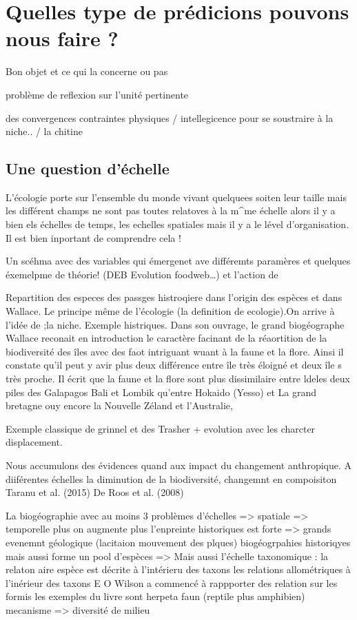 \section{Quelles type de prédicions pouvons nous faire
?}\label{quelles-type-de-pruxe9dicions-pouvons-nous-faire}

Bon objet et ce qui la concerne ou pas

problème de reflexion sur l'unité pertinente

des convergences contraintes physiques / intellegicence pour se
soustraire à la niche.. / la chitine

\subsection{Une question d'échelle}\label{une-question-duxe9chelle}

L'écologie porte sur l'ensemble du monde vivant quelquees soiten leur
taille mais les différent champs ne sont pas toutes relatoves à la
m\^{}me échelle alors il y a bien els échelles de temps, les echelles
spatiales mais il y a le lével d'organisation. Il est bien inportant de
comprendre cela !

Un scéhma avec des variables qui émergenet ave différemts paramères et
quelques éxemelpme de théorie! (DEB Evolution foodweb\ldots{}) et
l'action de

Repartition des especes des passges histroqiere dans l'origin des
espèces et dans Wallace. Le principe même de l'écologie (la definition
de ecologie).On arrive à l'idée de ;la niche. Exemple histriques. Dans
son ouvrage, le grand biogéographe Wallace reconait en introduction le
caractère facinant de la réaortition de la biodiversité des îles avec
des faot intriguant wuant à la faune et la flore. Ainsi il constate
qu'il peut y avir plus deux différence entre île très éloigné et deux
île s très proche. Il écrit que la faune et la flore sont plus
dissimilaire entre ldeles deux piles des Galapagos Bali et Lombik
qu'entre Hokaido (Yesso) et La grand bretagne ouy encore la Nouvelle
Zéland et l'Australie,

Exemple classique de grinnel et des Trasher + evolution avec les
charcter displacement.

Nous accumulons des évidences quand aux impact du changement
anthropique. A diiférentes échelles la diminution de la biodiversité,
changemnt en compoisiton Taranu et al. (2015) De Roos et al. (2008)

La biogéographie avec au moins 3 problèmes d'échelles =\textgreater{}
spatiale =\textgreater{} temporelle plus on augmente plus l'enpreinte
historiques est forte =\textgreater{} grands evenemnt géologique
(lacitaion mouvement des plques) biogéogrpahies historiqyes mais aussi
forme un pool d'espèces =\textgreater{} Mais aussi l'échelle taxonomique
: la relaton aire espèce est décrite à l'intérieru des taxons les
relations allométriques à l'inérieur des taxons E O Wilson a commencé à
rappporter des relation sur les formis les exemples du livre sont
herpeta faun (reptile plus amphibien) mecanisme =\textgreater{}
diversité de milieu

